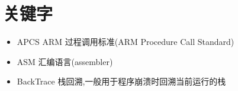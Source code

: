 \chapter{关键字}

\begin{itemize}
    \item APCS ARM 过程调用标准(ARM  Procedure Call Standard)
    \item ASM  汇编语言(assembler)
    \item BackTrace 栈回溯,一般用于程序崩溃时回溯当前运行的栈
\end{itemize}
